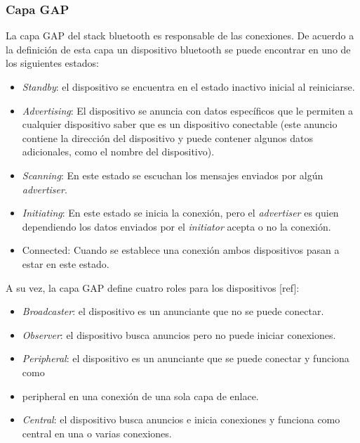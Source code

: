 \subsubsection{Capa GAP}
La capa GAP del stack bluetooth es responsable de las conexiones. De acuerdo a la definición de esta capa un dispositivo bluetooth se puede encontrar en uno de los siguientes estados:

\begin{itemize}
\item \textit{Standby}: el dispositivo se encuentra en el estado inactivo inicial al reiniciarse.
\item \textit{Advertising}: El dispositivo se anuncia con datos específicos que le permiten a cualquier dispositivo saber que es un dispositivo conectable (este anuncio contiene la dirección del dispositivo y puede contener algunos datos adicionales, como el nombre del dispositivo).
\item \textit{Scanning}: En este estado se escuchan los mensajes enviados por algún \textit{advertiser}.
\item \textit{Initiating}: En este estado se inicia la conexión, pero el \textit{advertiser} es quien dependiendo los datos enviados por el \textit{initiator} acepta o no la conexión.
\item Connected: Cuando se establece una conexión ambos dispositivos pasan a estar en este estado.
\end{itemize}

A su vez, la capa GAP define cuatro roles para los dispositivos [ref]:

\begin{itemize}
\item \textit{Broadcaster}: el dispositivo es un anunciante que no se puede conectar.
\item \textit{Observer}: el dispositivo busca anuncios pero no puede iniciar conexiones.
\item \textit{Peripheral}: el dispositivo es un anunciante que se puede conectar y funciona como \item peripheral en una conexión de una sola capa de enlace.
\item \textit{Central}: el dispositivo busca anuncios e inicia conexiones y funciona como central en una o varias conexiones.
\end{itemize}

